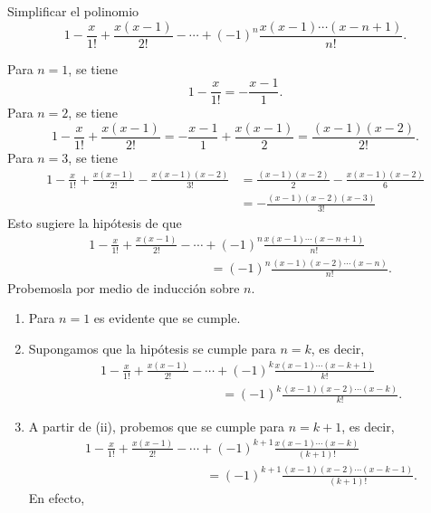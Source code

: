 \begin{examplebox}{}{}
    Simplificar el polinomio
    $$1 - \frac{x}{1!} + \frac{x(x - 1)}{2!} - \cdots + (-1)^n \frac{x(x - 1) \cdots (x - n + 1)}{n!}.$$

    \tcblower
    \solucion Para $n = 1$, se tiene
    $$1 - \frac{x}{1!} = - \frac{x - 1}{1}.$$
    Para $n = 2$, se tiene
    $$1 - \frac{x}{1!} + \frac{x(x - 1)}{2!} = - \frac{x - 1}{1} + \frac{x(x - 1)}{2} = \frac{(x - 1)(x - 2)}{2!}.$$
    Para $n = 3$, se tiene
    \begin{align*}
        1 - \frac{x}{1!} + \frac{x(x - 1)}{2!} - \frac{x(x - 1)(x - 2)}{3!} & = \frac{(x - 1)(x - 2)}{2} - \frac{x(x - 1)(x - 2)}{6} \\
        & = - \frac{(x - 1)(x - 2)(x - 3)}{3!}
    \end{align*}
    Esto sugiere la hipótesis de que
    \begin{align*}
        & 1 - \frac{x}{1!} + \frac{x(x - 1)}{2!} - \cdots + (-1)^n \frac{x(x - 1) \cdots (x - n + 1)}{n!} \\
        & \hspace{4cm} = (-1)^n \frac{(x - 1)(x - 2) \cdots (x - n)}{n!}.
    \end{align*}
    Probemosla por medio de inducción sobre $n$.
    \begin{enumerate}[label=\roman*., topsep=6pt, itemsep=0pt]
        \item Para $n = 1$ es evidente que se cumple.
        \item Supongamos que la hipótesis se cumple para $n = k$, es decir,
        \begin{align*}
            & 1 - \frac{x}{1!} + \frac{x(x - 1)}{2!} - \cdots + (-1)^k \frac{x(x - 1) \cdots (x - k + 1)}{k!} \\
            & \hspace{4cm} = (-1)^k \frac{(x - 1)(x - 2) \cdots (x - k)}{k!}.
        \end{align*}
        \item A partir de (ii), probemos que se cumple para $n = k + 1$, es decir,
        \begin{align*}
            & 1 - \frac{x}{1!} + \frac{x(x - 1)}{2!} - \cdots + (-1)^{k + 1} \frac{x(x - 1) \cdots (x - k)}{(k + 1)!} \\
            & \hspace{4cm} = (-1)^{k + 1} \frac{(x - 1)(x - 2) \cdots (x - k - 1)}{(k + 1)!}.
        \end{align*}
        En efecto,
        \begin{align*}

\end{align*}
\end{enumerate}
\end{examplebox}
